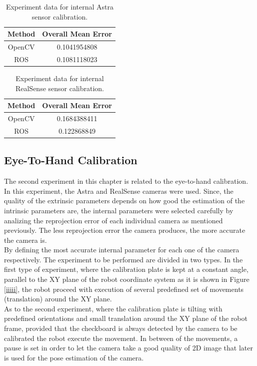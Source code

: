 \begin{table}[b]
\renewcommand{\arraystretch}{1.3}
\caption{Experiment data for internal Astra sensor calibration.}
\label{astra1}
\centering
\begin{tabular}{|c||c|}
\hline
Method & Overall Mean Error\\
\hline
OpenCV &  0.1041954808\\
\hline
ROS &  0.1081118023\\
\hline
\hline
\end{tabular}
\end{table}

\begin{table}[b]
\renewcommand{\arraystretch}{1.3}
\caption{Experiment data for internal RealSense sensor calibration.}
\label{real1}
\centering
\begin{tabular}{|c||c|}
\hline
Method & Overall Mean Error\\
\hline
OpenCV &  0.1684388411\\
\hline
ROS &  0.122868849\\
\hline
\hline
\end{tabular}
\end{table}

\subsection{Eye-To-Hand Calibration}
The second experiment in this chapter is related to the eye-to-hand calibration. In this experiment, the Astra and RealSense cameras were used. Since, the quality of the extrinsic parameters depends on how good the estimation of the intrinsic parameters are, the internal parameters were selected carefully by analizing the reprojection error of each individual camera as mentioned previously. The less reprojection error the camera produces, the more accurate the camera is. \\
By defining the most accurate internal parameter for each one of the camera respectively. The experiment to be performed are divided in two types.
In the first type of experiment, where the calibration plate is kept at a constant angle, parallel to the XY plane of the robot coordinate system as it is shown in Figure \ref{iiiii}, the robot proceed with execution of several predefined set of movements (translation) around the XY plane.\\ 
As to the second experiment, where the calibration plate is   tilting with predefined orientations and small translation around the XY plane of the robot frame, provided that the checkboard is always detected by the camera to be calibrated the robot execute the movement. In between of the movements, a pause is set in order to let the camera take a good quality of 2D image that later is used for the pose estimation of the camera.\\

